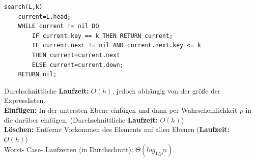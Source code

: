 \documentclass{article}
\begin{document}
            \begin{lstlisting}[style=pseudocode]
search(L,k)
    current=L.head;
    WHILE current != nil DO
        IF current.key == k THEN RETURN current;
        IF current.next != nil AND current.next.key <= k
        THEN current=current.next
        ELSE current=current.down;
    RETURN nil;
            \end{lstlisting}
            Durchschnittliche \textbf{Laufzeit:} $O(h)$, jedoch abhängig von der größe der Expresslisten.\\
            \textbf{Einfügen:} In der untersten Ebene einfügen und dann per Wahrscheinlichkeit $p$ in die darüber einfügen. (Durchschnittliche \textbf{Laufzeit:} $O(h)$)\\ 
            \textbf{Löschen:} Entferne Vorkommen des Elements auf allen Ebenen (\textbf{Laufzeit:} $O(h)$)\\
            Worst- Case- Laufzeiten (in Durchschnitt): $\Theta(log_{1/p}n)$.
\end{document}
